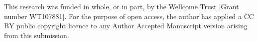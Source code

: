 \documentclass{bioinfo}
\begin{document}
This research was funded in whole, or in part, by the Wellcome Trust [Grant number WT107881]. For the purpose of open access, the author has applied a CC BY public copyright licence to any Author Accepted Manuscript version arising from this submission.
\vspace*{-12pt}


%
%
%
%
%
%
%
%
  









\end{document}
